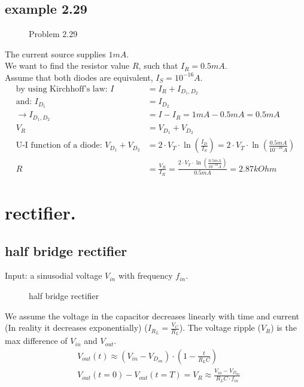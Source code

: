 \documentclass[11ypt]{extarticle}
\begin{document}
\subsection{example 2.29}

\begin{figure}[H]{} 
    \centering
    
    \caption{Problem 2.29}
\end{figure}

The current source supplies $1 \si{mA}$. \\
We want to find the resistor value $R$, such that $I_R = 0.5 \si{mA}$. \\
Assume that both diodes are equivalent, $I_S = 10^{-16} \si{A}$.
\begin{equation}
\begin{aligned}
	\text{by using Kirchhoff's law: } I &= I_R + I_{D_1, D_2}
	\\
	\text{and: } I_{D_1} &= I_{D_2}
	\\
	\to I_{D_1, D_2} &= I - I_R = 1\si{mA} - 0.5\si{mA} = 0.5\si{mA}
	\\
	V_R &= V_{D_{1}} + V_{D_{2}}
	\\
	\text{U-I function of a diode: }V_{D_{1}} + V_{D_{2}} &= 2 \cdot V_T \cdot \ln{\left( \frac{I_D}{I_S} \right)} = 2 \cdot V_T \cdot \ln{\left( \frac{0.5\si{mA}}{10^{-16} \si{A}} \right)}
	\\
	R &= \frac{V_R}{I_R} = \frac{2 \cdot V_T \cdot \ln{\left( \frac{0.5\si{mA}}{10^{-16} \si{A}} \right)}}{0.5 \si{mA}} = 2.87 \si{kOhm}
\end{aligned}
\end{equation}

\section{rectifier.}

\subsection{half bridge rectifier}

Input: a sinusodial voltage $V_{in}$ with frequency $f_{in}$.

\begin{figure}[H]{}
    \centering
    
    \caption{half bridge rectifier}
\end{figure}

We assume the voltage in the capacitor decreases linearly with time and current (In reality it decreases exponentially) ($I_{R_L} = \frac{V_C}{R_L}$). The voltage ripple ($V_R$) is the max difference of $V_{in}$ and $V_{out}$.
\begin{equation}
\begin{aligned}
    &V_{out}(t) \approx (V_{in} - V_{D_{on}}) \cdot \left(1 - \frac{t}{R_LC}\right)
    \\
    &V_{out}(t = 0) - V_{out}(t = T) = V_R \approx \frac{V_{in} - V_{D_{on}}}{R_LC\cdot f_{in}}
\end{aligned}
\end{equation}
\end{document}
